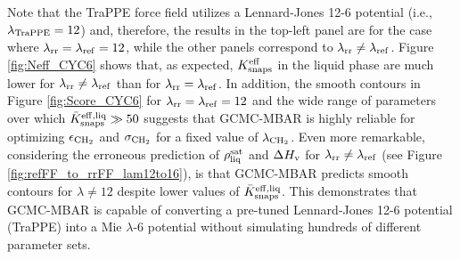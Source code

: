 \documentclass[journal=jced,manuscript=article]{achemso}
\begin{document}


Note that the TraPPE force field utilizes a Lennard-Jones 12-6 potential (i.e., $\lambda_{\rm TraPPE} = 12$) and, therefore, the results in the top-left panel are for the case where $\lambda_{\rm rr} = \lambda_{\rm ref} = 12$, while the other panels correspond to $\lambda_{\rm rr} \neq \lambda_{\rm ref}$. Figure \ref{fig:Neff_CYC6} shows that, as expected, $K_{\rm snaps}^{\rm eff}$ in the liquid phase are much lower for $\lambda_{\rm rr} \neq \lambda_{\rm ref}$ than for $\lambda_{\rm rr} = \lambda_{\rm ref}$. In addition, the smooth contours in Figure \ref{fig:Score_CYC6} for $\lambda_{\rm rr} = \lambda_{\rm ref} = 12$ and the wide range of parameters over which $\bar K_{\rm snaps}^{\rm eff, liq} \gg 50$ suggests that GCMC-MBAR is highly reliable for optimizing $\epsilon_{\rm CH_2}$ and $\sigma_{\rm CH_2}$ for a fixed value of $\lambda_{\rm CH_2}$. 
Even more remarkable, considering the erroneous prediction of $\rho_{\rm liq}^{\rm sat}$ and $\Delta H_{\rm v}$ for $\lambda_{\rm rr} \neq \lambda_{\rm ref}$ (see Figure \ref{fig:refFF_to_rrFF_lam12to16}), is that GCMC-MBAR predicts smooth contours for $\lambda \neq 12$ despite lower values of $\bar K_{\rm snaps}^{\rm eff, liq}$. This demonstrates that GCMC-MBAR is capable of converting a pre-tuned Lennard-Jones 12-6 potential (TraPPE) into a Mie $\lambda$-6 potential without simulating hundreds of different parameter sets.     
\end{document}
